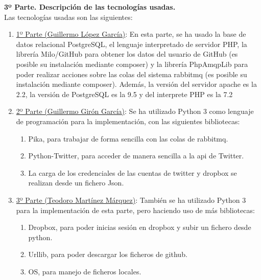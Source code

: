 \documentclass{article}
\begin{document}
\textbf{3º Parte. Descripción de las tecnologías usadas.}\\
Las tecnologías usadas son las siguientes:
\begin{enumerate}
    \item \underline{1º Parte (Guillermo López García)}: En esta parte, se ha usado
        la base de datos relacional PostgreSQL, el lenguaje interpretado de servidor
        PHP, la librería Milo/GitHub para obtener los datos del usuario de GitHub
        (es posible su instalación mediante composer) y la librería PhpAmqpLib para
        poder realizar acciones sobre las colas del sistema rabbitmq (es posible su
        instalación mediante composer). Además, la versión del servidor apache es la
        2.2, la versión de PostgreSQL es la 9.5 y del interprete PHP es la 7.2
    \item \underline{2º Parte (Guillermo Girón García)}: Se ha utilizado Python 3 como
    lenguaje de programación para la implementación, con las siguientes bibliotecas:
    \begin{enumerate}
        \item Pika, para trabajar de forma sencilla con las colas de rabbitmq.
        \item Python-Twitter, para acceder de manera sencilla a la api de Twitter.
        \item La carga de los credenciales de las cuentas de twitter y dropbox se realizan desde un fichero Json.
    \end{enumerate}
    \item \underline{3º Parte (Teodoro Martínez Márquez)}: También se ha utilizado Python 3
    para la implementación de esta parte, pero haciendo uso de más bibliotecas:
    \begin{enumerate}
       \item Dropbox, para poder inicias sesión en dropbox y subir un fichero desde python.
       \item Urllib, para poder descargar los ficheros de github.
       \item OS, para manejo de ficheros locales.
    \end{enumerate}

\end{enumerate}
\end{document}
